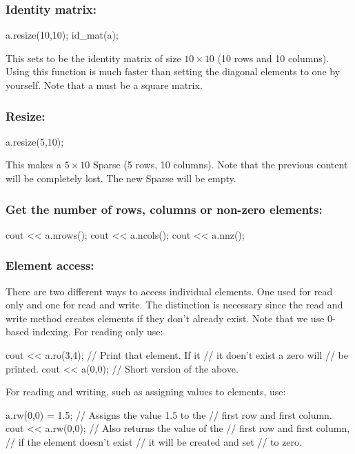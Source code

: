 \subsubsection{Identity matrix:}
\begin{code}
a.resize(10,10);
id_mat(a);
\end{code}
This sets  to be the identity matrix of size $10 \times 10$ (10 rows
and 10 columns). Using this function is much faster than setting the
diagonal elements to one by yourself. Note that a must be a square matrix.

\subsubsection{Resize:}
\begin{code}
a.resize(5,10);
\end{code}
This makes  a $5 \times 10$ Sparse (5 rows, 10 columns). Note that the
previous content will be completely lost. The new Sparse will be empty.

\subsubsection{Get the number of rows, columns or non-zero elements:}
\begin{code}
cout << a.nrows();
cout << a.ncols();
cout << a.nnz();
\end{code}

\subsubsection{Element access:}
There are two different ways to access individual elements. One used for
read only and one for read and write. The distinction is necessary since
the read and write method creates elements if they don't already exist.
Note that we use 0-based indexing. For reading only use:
\begin{code}
cout << a.ro(3,4);  // Print that element. If it
                    // it doen't exist a zero will
                    // be printed.
cout << a(0,0);     // Short version of the above.
\end{code}

For reading and writing, such as assigning values to elements, use:
\begin{code}
a.rw(0,0) = 1.5;    // Assigns the value 1.5 to the
                    // first row and first column.
cout << a.rw(0,0);  // Also returns the value of the
                    // first row and first column,
                    // if the element doesn't exist
                    // it will be created and set
                    // to zero.
\end{code}

